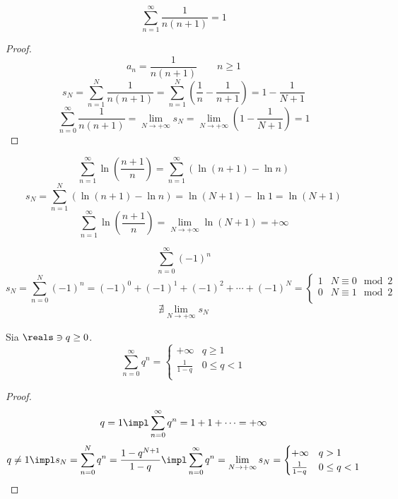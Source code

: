\begin{lemma}
  $$\sum_{n=1}^\infty\frac{1}{n\left( n+1 \right) }=1$$
\end{lemma}
\begin{proof}
  $$a_n=\frac{1}{n\left( n+1 \right)}\qquad n\ge1$$
  $$s_N=\sum_{n=1}^N\frac{1}{n\left( n+1 \right)}=\sum_{n=1}^N\left( \frac{1}{n}-\frac{1}{n+1} \right)=1-\frac{1}{N+1}$$
  $$\sum_{n=0}^\infty\frac{1}{n\left( n+1 \right)}=\lim_{N\to+\infty}s_N=\lim_{N\to+\infty}\left( 1-\frac{1}{N+1} \right)=1$$
\end{proof}

\begin{example}
  $$\sum_{n=1}^\infty\ln\left( \frac{n+1}{n} \right)=\sum_{n=1}^\infty\left( \ln\left( n+1 \right)-\ln n \right)$$
  $$s_N=\sum_{n=1}^N\left( \ln\left( n+1 \right)-\ln n \right)=\ln\left( N+1 \right)-\ln 1=\ln\left( N+1 \right)$$
  $$\sum_{n=1}^\infty\ln\left( \frac{n+1}{n} \right)=\lim_{N\to+\infty}\ln\left( N+1 \right)=+\infty$$
\end{example}

\begin{example}
  $$\sum_{n=0}^\infty\left( -1 \right)^n$$
  $$
    s_N=\sum_{n=0}^N\left( -1 \right)^n=\left( -1 \right)^0+\left( -1 \right)^1+\left( -1 \right)^2+\cdots+\left( -1 \right)^N=
    \begin{cases}
      1 & N\equiv 0 \mod{2} \\
      0 & N\equiv 1 \mod{2} \\
    \end{cases}
  $$
  $$\nexists \lim_{N\to+\infty}s_N$$
\end{example}

\begin{theorem}
  Sia $\reals\ni q\ge0$.
  $$
    \sum_{n=0}^\infty q^n=
    \begin{cases}
      +\infty       & q\ge1    \\
      \frac{1}{1-q} & 0\le q<1 \\
    \end{cases}
  $$
\end{theorem}
\begin{proof}
  $$q=1\impl \sum_{n=0}^\infty q^n=1+1+\cdots=+\infty$$
  $$
    q\neq1
    \impl s_N=\sum_{n=0}^N q^n=\frac{1-q^{N+1}}{1-q}
    \impl \sum_{n=0}^\infty q^n=
    \lim_{N\to+\infty}s_N=
    \begin{cases}
      +\infty       & q>1      \\
      \frac{1}{1-q} & 0\le q<1 \\
    \end{cases}
  $$
\end{proof}

